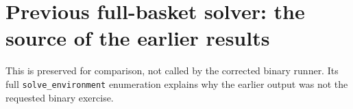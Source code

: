\section{Previous full-basket solver: the source of the earlier results}
This is preserved for comparison, not called by the corrected binary runner. Its full \texttt{solve\_environment} enumeration explains why the earlier output was not the requested binary exercise.

